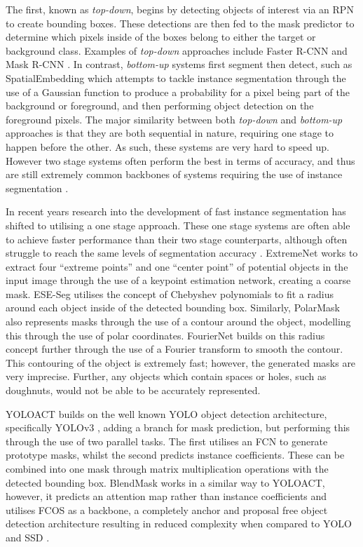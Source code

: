 The first, known as \textit{top-down}, begins by detecting objects of interest via an RPN to create bounding boxes. These detections are then fed to the mask predictor to determine which pixels inside of the boxes belong to either the target or background class. Examples of \textit{top-down} approaches include Faster R-CNN \cite{ren_faster_2015} and Mask R-CNN \cite{he_mask_2017}. In contrast, \textit{bottom-up} systems first segment then detect, such as SpatialEmbedding \cite{neven_instance_2019} which attempts to tackle instance segmentation through the use of a Gaussian function to produce a probability for a pixel being part of the background or foreground, and then performing object detection on the foreground pixels. The major similarity between both \textit{top-down} and \textit{bottom-up} approaches is that they are both sequential in nature, requiring one stage to happen before the other. As such, these systems are very hard to speed up. However two stage systems often perform the best in terms of accuracy, and thus are still extremely common backbones of systems requiring the use of instance segmentation \cite{soviany_optimizing_2018}.

In recent years research into the development of fast instance segmentation has shifted to utilising a one stage approach. These one stage systems are often able to achieve faster performance than their two stage counterparts, although often struggle to reach the same levels of segmentation accuracy \cite{soviany_optimizing_2018}. ExtremeNet \cite{zhou_bottom-up_2019} works to extract four ``extreme points'' and one ``center point'' of potential objects in the input image through the use of a keypoint estimation network, creating a coarse mask. ESE-Seg \cite{xu_explicit_2019} utilises the concept of Chebyshev polynomials to fit a radius around each object inside of the detected bounding box. Similarly, PolarMask \cite{xie_polarmask_2020} also represents masks through the use of a contour around the object, modelling this through the use of polar coordinates. FourierNet \cite{riaz_fouriernet_2020} builds on this radius concept further through the use of a Fourier transform to smooth the contour. This contouring of the object is extremely fast; however, the generated masks are very imprecise. Further, any objects which contain spaces or holes, such as doughnuts, would not be able to be accurately represented. 

YOLOACT \cite{bolya_190402689_2019} builds on the well known YOLO object detection architecture, specifically YOLOv3 \cite{redmon_yolov3_2018}, adding a branch for mask prediction, but performing this through the use of two parallel tasks. The first utilises an FCN to generate prototype masks, whilst the second predicts instance coefficients. These can be combined into one mask through matrix multiplication operations with the detected bounding box. BlendMask \cite{chen_blendmask_2020} works in a similar way to YOLOACT, however, it predicts an attention map rather than instance coefficients and utilises FCOS \cite{tian_fcos_2019} as a backbone, a completely anchor and proposal free object detection architecture resulting in reduced complexity when compared to YOLO \cite{redmon_you_2016} and SSD \cite{liu_ssd:_2016}. 

